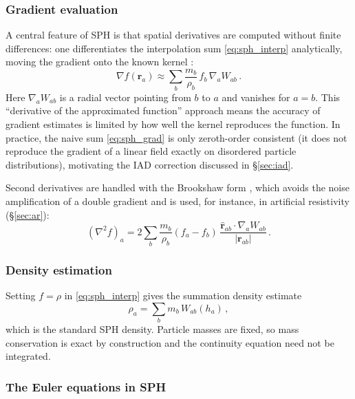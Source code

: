 \subsubsection*{Gradient evaluation}

A central feature of SPH is that spatial derivatives are computed without finite differences: one differentiates the interpolation sum \eqref{eq:sph_interp} analytically, moving the gradient onto the known kernel \cite{Rosswog2009}:
\begin{equation}
    \nabla f(\mathbf{r}_a) \approx \sum_b \frac{m_b}{\rho_b} \, f_b \, \nabla_a W_{ab}\,.
    \label{eq:sph_grad}
\end{equation}
Here $\nabla_a W_{ab}$ is a radial vector pointing from $b$ to $a$ and vanishes for $a = b$.
This ``derivative of the approximated function'' approach means the accuracy of gradient estimates is limited by how well the kernel reproduces the function. In practice, the naive sum \eqref{eq:sph_grad} is only zeroth-order consistent (it does not reproduce the gradient of a linear field exactly on disordered particle distributions), motivating the IAD correction discussed in \S\ref{sec:iad}.

Second derivatives are handled with the Brookshaw form \cite{Rosswog2009}, which avoids the noise amplification of a double gradient and is used, for instance, in artificial resistivity (\S\ref{sec:ar}):
\begin{equation}
    (\nabla^2 f)_a = 2 \sum_b \frac{m_b}{\rho_b} (f_a - f_b) \, \frac{\hat{\mathbf{r}}_{ab} \cdot \nabla_a W_{ab}}{|\mathbf{r}_{ab}|}\,.
    \label{eq:brookshaw}
\end{equation}


\subsubsection*{Density estimation}

Setting $f = \rho$ in \eqref{eq:sph_interp} gives the summation density estimate
\begin{equation}
    \rho_a = \sum_b m_b \, W_{ab}(h_a)\,,
    \label{eq:density_sum}
\end{equation}
which is the standard SPH density. Particle masses are fixed, so mass conservation is exact by construction and the continuity equation need not be integrated.


\subsubsection*{The Euler equations in SPH}


